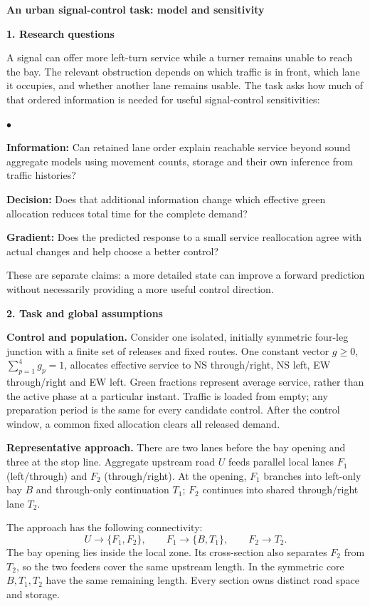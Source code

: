 \documentclass[10pt,a4paper]{article}
\newcommand{\head}[1]{\par\vspace{4pt}\noindent\textbf{#1}\par\nobreak\vspace{1pt}}
\newenvironment{points}{\begin{list}{$\bullet$}{%
 \setlength{\leftmargin}{1.4em}\setlength{\labelwidth}{0.7em}%
 \setlength{\labelsep}{0.4em}\setlength{\itemsep}{2pt}%
 \setlength{\parsep}{0pt}\setlength{\topsep}{3pt}}}{\end{list}}
\begin{document}
\begin{center}
{\large\bfseries An urban signal-control task: model and sensitivity}
\end{center}
\vspace{-5pt}

\head{1. Research questions}
A signal can offer more left-turn service while a turner remains unable
to reach the bay. The relevant obstruction depends on which traffic is
in front, which lane it occupies, and whether another lane remains usable.
The task asks how much of that ordered information is needed for useful
signal-control sensitivities:
\begin{points}
\item \textbf{Information:} Can retained lane order explain reachable
service beyond sound aggregate models using movement counts, storage
and their own inference from traffic histories?
\item \textbf{Decision:} Does that additional information change which
effective green allocation reduces total time for the complete demand?
\item \textbf{Gradient:} Does the predicted response to a small service
reallocation agree with actual changes and help choose a better control?
\end{points}
These are separate claims: a more detailed state can improve a forward
prediction without necessarily providing a more useful control direction.

\head{2. Task and global assumptions}
\textbf{Control and population.} Consider one isolated, initially symmetric
four-leg junction with a finite set of releases and fixed routes.
One constant vector $g\geq0$, $\sum_{p=1}^4g_p=1$, allocates effective
service to NS through/right, NS left, EW through/right and EW left.
Green fractions represent average service, rather than the active phase
at a particular instant. Traffic is loaded from empty; any preparation
period is the same for every candidate control. After the control window,
a common fixed allocation clears all released demand.

\textbf{Representative approach.} There are two lanes before the bay
opening and three at the stop line. Aggregate upstream road $U$ feeds
parallel local lanes $F_1$ (left/through) and $F_2$ (through/right).
At the opening, $F_1$ branches into left-only bay $B$ and through-only
continuation $T_1$; $F_2$ continues into shared through/right lane $T_2$.

The approach has the following connectivity:
\[
 U\longrightarrow\{F_1,F_2\},\qquad
 F_1\longrightarrow\{B,T_1\},\qquad F_2\longrightarrow T_2.
\]
The bay opening lies inside the local zone. Its cross-section also
separates $F_2$ from $T_2$, so the two feeders cover the same upstream
length. In the symmetric core $B,T_1,T_2$ have the same remaining length.
Every section owns distinct road space and storage.
\end{document}
